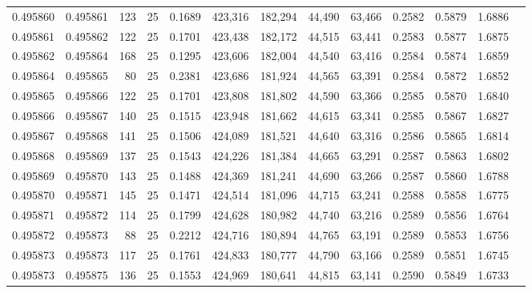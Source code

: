 \begin{tabular}{rrrrrrrrrrrrr}
0.495860 & 0.495861 &   123 &  25 &                                     0.1689 & 423,316 & 182,294 &  44,490 &  63,466 & 0.2582 & 0.5879 & 1.6886 \\
0.495861 & 0.495862 &   122 &  25 &                                     0.1701 & 423,438 & 182,172 &  44,515 &  63,441 & 0.2583 & 0.5877 & 1.6875 \\
0.495862 & 0.495864 &   168 &  25 &                                     0.1295 & 423,606 & 182,004 &  44,540 &  63,416 & 0.2584 & 0.5874 & 1.6859 \\
0.495864 & 0.495865 &    80 &  25 &                                     0.2381 & 423,686 & 181,924 &  44,565 &  63,391 & 0.2584 & 0.5872 & 1.6852 \\
0.495865 & 0.495866 &   122 &  25 &                                     0.1701 & 423,808 & 181,802 &  44,590 &  63,366 & 0.2585 & 0.5870 & 1.6840 \\
0.495866 & 0.495867 &   140 &  25 &                                     0.1515 & 423,948 & 181,662 &  44,615 &  63,341 & 0.2585 & 0.5867 & 1.6827 \\
0.495867 & 0.495868 &   141 &  25 &                                     0.1506 & 424,089 & 181,521 &  44,640 &  63,316 & 0.2586 & 0.5865 & 1.6814 \\
0.495868 & 0.495869 &   137 &  25 &                                     0.1543 & 424,226 & 181,384 &  44,665 &  63,291 & 0.2587 & 0.5863 & 1.6802 \\
0.495869 & 0.495870 &   143 &  25 &                                     0.1488 & 424,369 & 181,241 &  44,690 &  63,266 & 0.2587 & 0.5860 & 1.6788 \\
0.495870 & 0.495871 &   145 &  25 &                                     0.1471 & 424,514 & 181,096 &  44,715 &  63,241 & 0.2588 & 0.5858 & 1.6775 \\
0.495871 & 0.495872 &   114 &  25 &                                     0.1799 & 424,628 & 180,982 &  44,740 &  63,216 & 0.2589 & 0.5856 & 1.6764 \\
0.495872 & 0.495873 &    88 &  25 &                                     0.2212 & 424,716 & 180,894 &  44,765 &  63,191 & 0.2589 & 0.5853 & 1.6756 \\
0.495873 & 0.495873 &   117 &  25 &                                     0.1761 & 424,833 & 180,777 &  44,790 &  63,166 & 0.2589 & 0.5851 & 1.6745 \\
0.495873 & 0.495875 &   136 &  25 &                                     0.1553 & 424,969 & 180,641 &  44,815 &  63,141 & 0.2590 & 0.5849 & 1.6733 \\

\end{tabular}
